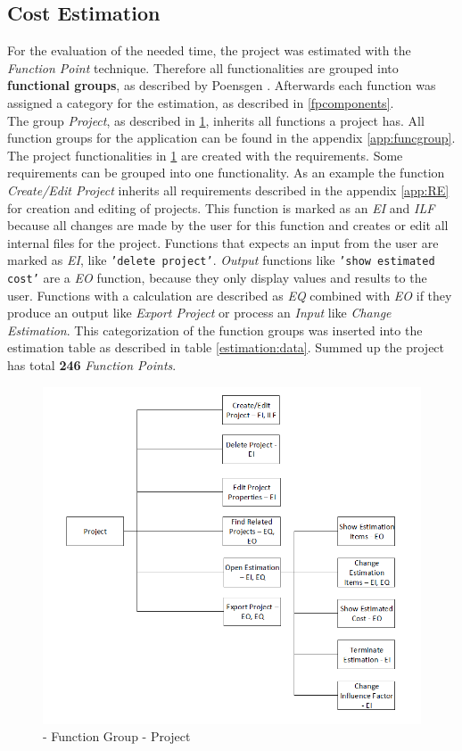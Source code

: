 \subsection{Cost Estimation}
For the evaluation of the needed time, the project was estimated with the \textit{Function Point} technique. Therefore all functionalities are grouped into \textbf{functional groups}, as described by Poensgen \cite{FPKompakt}. Afterwards each function was assigned a category for the estimation, as described in \ref{fpcomponents}.\\
The group \textit{Project}, as described in \ref{fig:projectFunctionalityGroup}, inherits all functions a project has. All function groups for the application can be found in the appendix \ref{app:funcgroup}. The project functionalities in \ref{fig:projectFunctionalityGroup} are created with the requirements. Some requirements can be grouped into one functionality. As an example the function \textit{Create/Edit Project} inherits all requirements described in the appendix \ref{app:RE} for creation and editing of projects. This function is marked as an \textit{EI} and \textit{ILF} because all changes are made by the user for this function and creates or edit all internal files for the project. Functions that expects an input from the user are marked as \textit{EI}, like \texttt{'delete project'}. \textit{Output} functions like \texttt{'show estimated cost'} are a \textit{EO} function, because they only display values and results to the user. Functions with a calculation are described as \textit{EQ} combined with \textit{EO} if they produce an output like \textit{Export Project} or process an \textit{Input} like \textit{Change Estimation}. This categorization of the function groups was inserted into the estimation table as described in table \ref{estimation:data}. Summed up the project has total \textbf{246} \textit{Function Points}.
\begin{figure}[h] 
	\centering 
	\includegraphics[width=14cm]{images/ScreenOverviewProject.PNG} 
	\caption{- Function Group - Project} 
	\label{fig:projectFunctionalityGroup}
\end{figure}
